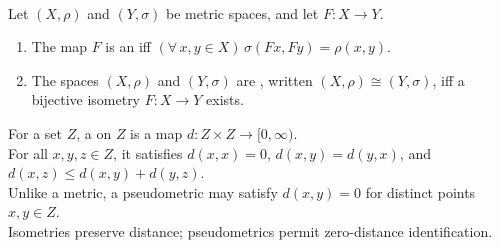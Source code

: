 \begin{definition} \label{def:isometry-and-isometric-metric-spaces} \\
Let $(X,\rho)$ and $(Y,\sigma)$ be metric spaces, and let $F:X\to Y$.
\begin{enumerate}[label=(\roman*)]
\setlength{\itemsep}{0pt}
\item The map $F$ is an  iff $(\forall\,x,y\in X)\,\sigma(Fx,Fy)=\rho(x,y)$.
\item The spaces $(X,\rho)$ and $(Y,\sigma)$ are , written $(X,\rho)\cong(Y,\sigma)$, iff a bijective isometry $F:X\to Y$ exists.
\end{enumerate}
For a set $Z$, a  on $Z$ is a map $d:Z\times Z\to[0,\infty)$.\\
For all $x,y,z\in Z$, it satisfies $d(x,x)=0$, $d(x,y)=d(y,x)$, and $d(x,z)\leq d(x,y)+d(y,z)$.\\
Unlike a metric, a pseudometric may satisfy $d(x,y)=0$ for distinct points $x,y\in Z$.\\
Isometries preserve distance; pseudometrics permit zero-distance identification.
\end{definition}

